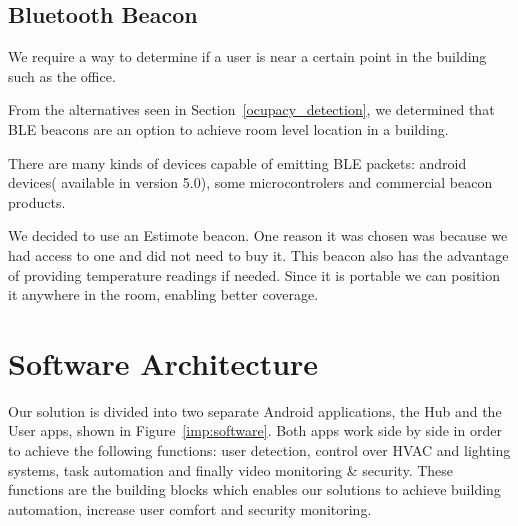 \subsection{Bluetooth Beacon}

We require a way to determine if a user is near a certain point in the building such as the office.

From the alternatives seen in Section~\ref{ocupacy_detection}, we  determined that \ac{BLE} beacons are an option to achieve room level location in a building.

There are many kinds of devices capable of emitting \ac{BLE} packets: android devices( available in version 5.0), some microcontrolers and commercial beacon products.

We decided to use an Estimote beacon. One reason it was chosen was because we had access to one and did not need to buy it. This beacon also has the advantage of providing temperature readings if needed. Since it is portable we can position it anywhere in the room, enabling better coverage.


\section{Software Architecture}


Our solution is divided into two separate Android applications, the Hub and the User apps, shown in Figure~\ref{imp:software}. Both apps work side by side in order to achieve the following functions: user detection, control over \ac{HVAC} and lighting systems, task automation and finally video monitoring \& security. These functions are the building blocks which enables our solutions to achieve building automation, increase user comfort and security monitoring.

